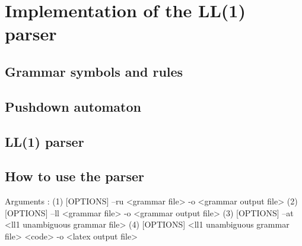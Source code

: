 \chapter{Implementation of the LL(1) parser}

\section{Grammar symbols and rules}

\section{Pushdown automaton}

\section{LL(1) parser}

\section{How to use the parser}

Arguments :
    (1) [OPTIONS] --ru <grammar file> -o <grammar output file>
    (2) [OPTIONS] --ll <grammar file> -o <grammar output file>
    (3) [OPTIONS] --at <ll1 unambiguous grammar file>
    (4) [OPTIONS] <ll1 unambiguous grammar file> <code> -o <latex output file>